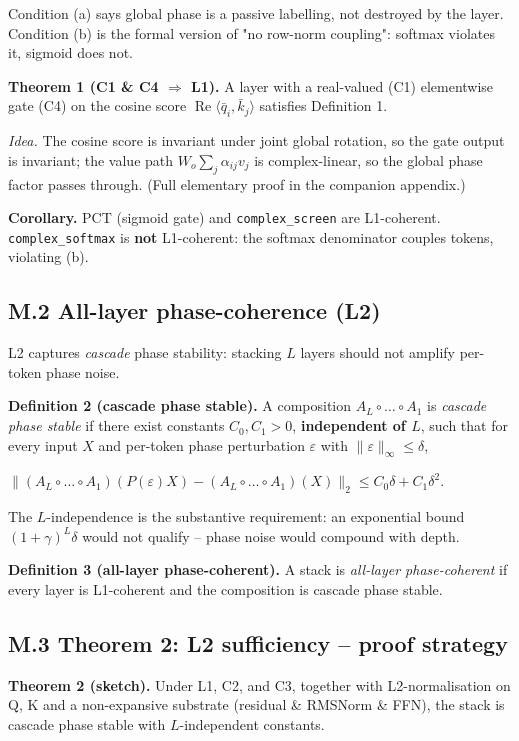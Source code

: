 \documentclass[11pt,a4paper]{article}
\theoremstyle{plain}
\theoremstyle{definition}
\renewcommand{\Re}{\operatorname{Re}}
\begin{document}
Condition (a) says global phase is a passive labelling, not destroyed by the layer. Condition (b) is the formal version of "no row-norm coupling": softmax violates it, sigmoid does not.

\textbf{Theorem 1 (C1 \& C4 $\Rightarrow$ L1).} A layer with a real-valued (C1) elementwise gate (C4) on the cosine score $\Re\langle\bar q_i,\bar k_j\rangle$ satisfies Definition 1.

\emph{Idea.} The cosine score is invariant under joint global rotation, so the gate output is invariant; the value path $W_o\sum_j \alpha_{ij} v_j$ is complex-linear, so the global phase factor passes through. (Full elementary proof in the companion appendix.)

\textbf{Corollary.} PCT (sigmoid gate) and \texttt{complex\_screen} are L1-coherent. \texttt{complex\_softmax} is \textbf{not} L1-coherent: the softmax denominator couples tokens, violating (b).

\subsection*{M.2 All-layer phase-coherence (L2)}
L2 captures \emph{cascade} phase stability: stacking $L$ layers should not amplify per-token phase noise.

\textbf{Definition 2 (cascade phase stable).} A composition $A_L \circ \dots \circ A_1$ is \emph{cascade phase stable} if there exist constants $C_0, C_1 > 0$, \textbf{independent of $L$}, such that for every input $X$ and per-token phase perturbation $\varepsilon$ with $\|\varepsilon\|_\infty \le \delta$,

$\|(A_L \circ \dots \circ A_1)(P(\varepsilon)X) - (A_L \circ \dots \circ A_1)(X)\|_2 \le C_0 \delta + C_1 \delta^2.$

The $L$-independence is the substantive requirement: an exponential bound $(1+\gamma)^L \delta$ would not qualify -- phase noise would compound with depth.

\textbf{Definition 3 (all-layer phase-coherent).} A stack is \emph{all-layer phase-coherent} if every layer is L1-coherent and the composition is cascade phase stable.

\subsection*{M.3 Theorem 2: L2 sufficiency -- proof strategy}
\textbf{Theorem 2 (sketch).} Under L1, C2, and C3, together with L2-normalisation on Q, K and a non-expansive substrate (residual \& RMSNorm \& FFN), the stack is cascade phase stable with $L$-independent constants.
\end{document}
